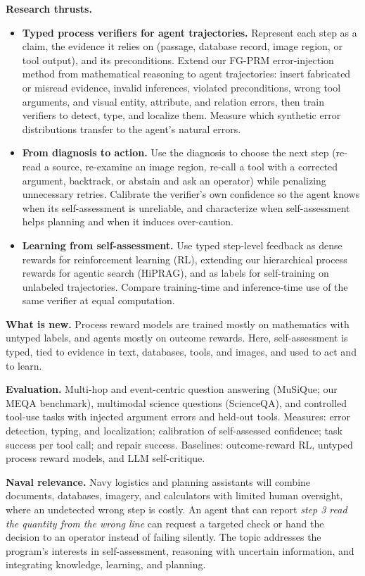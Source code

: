 \documentclass[11pt]{article}
\newcommand{\head}[1]{{\color{navy}\textbf{#1}}\enspace}
\begin{document}
\head{Research thrusts.}
\begin{itemize}
\item \textbf{Typed process verifiers for agent trajectories.} Represent each step as a claim, the evidence it relies on (passage, database record, image region, or tool output), and its preconditions. Extend our FG-PRM error-injection method from mathematical reasoning to agent trajectories: insert fabricated or misread evidence, invalid inferences, violated preconditions, wrong tool arguments, and visual entity, attribute, and relation errors, then train verifiers to detect, type, and localize them. Measure which synthetic error distributions transfer to the agent's natural errors.
\item \textbf{From diagnosis to action.} Use the diagnosis to choose the next step (re-read a source, re-examine an image region, re-call a tool with a corrected argument, backtrack, or abstain and ask an operator) while penalizing unnecessary retries. Calibrate the verifier's own confidence so the agent knows when its self-assessment is unreliable, and characterize when self-assessment helps planning and when it induces over-caution.
\item \textbf{Learning from self-assessment.} Use typed step-level feedback as dense rewards for reinforcement learning (RL), extending our hierarchical process rewards for agentic search (HiPRAG), and as labels for self-training on unlabeled trajectories. Compare training-time and inference-time use of the same verifier at equal computation.
\end{itemize}

\head{What is new.} Process reward models are trained mostly on mathematics with untyped labels, and agents mostly on outcome rewards. Here, self-assessment is typed, tied to evidence in text, databases, tools, and images, and used to act and to learn.

\head{Evaluation.} Multi-hop and event-centric question answering (MuSiQue; our MEQA benchmark), multimodal science questions (ScienceQA), and controlled tool-use tasks with injected argument errors and held-out tools. Measures: error detection, typing, and localization; calibration of self-assessed confidence; task success per tool call; and repair success. Baselines: outcome-reward RL, untyped process reward models, and LLM self-critique.

\head{Naval relevance.} Navy logistics and planning assistants will combine documents, databases, imagery, and calculators with limited human oversight, where an undetected wrong step is costly. An agent that can report \emph{step 3 read the quantity from the wrong line} can request a targeted check or hand the decision to an operator instead of failing silently. The topic addresses the program's interests in self-assessment, reasoning with uncertain information, and integrating knowledge, learning, and planning.
\end{document}
